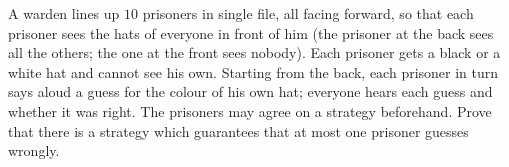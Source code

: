 A warden lines up $10$ prisoners in single file, all facing forward, so that each prisoner sees the hats of everyone in front of him (the prisoner at the back sees all the others; the one at the front sees nobody). Each prisoner gets a black or a white hat and cannot see his own. Starting from the back, each prisoner in turn says aloud a guess for the colour of his own hat; everyone hears each guess and whether it was right. The prisoners may agree on a strategy beforehand. Prove that there is a strategy which guarantees that at most one prisoner guesses wrongly.
